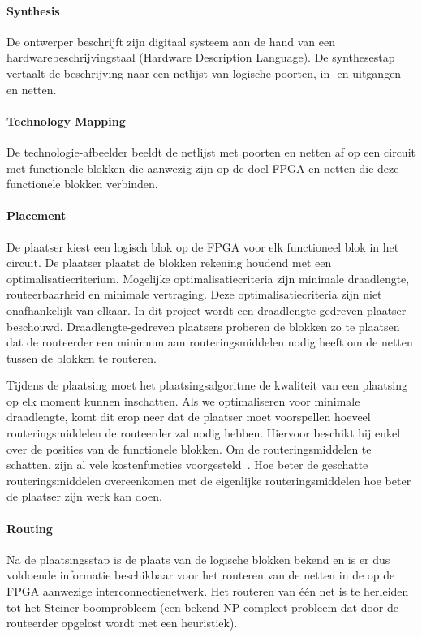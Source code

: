 \documentclass[a4paper,oneside,12pt]{article}
\begin{document}
\paragraph{Synthesis}
De ontwerper beschrijft zijn digitaal systeem aan de hand van een hardwarebeschrijvingstaal (Hardware Description Language). De synthesestap vertaalt de beschrijving naar een netlijst van logische poorten, in- en uitgangen en netten.

\paragraph{Technology Mapping} 
De technologie-afbeelder beeldt de netlijst met poorten en netten af op een circuit met functionele blokken die aanwezig zijn op de doel-FPGA en netten die deze functionele blokken verbinden.

\paragraph{Placement}
De plaatser kiest een logisch blok op de FPGA voor elk functioneel blok in het circuit. De plaatser plaatst de blokken rekening houdend met een optimalisatiecriterium. Mogelijke optimalisatiecriteria zijn minimale draadlengte, routeerbaarheid en minimale vertraging. Deze optimalisatiecriteria zijn niet onafhankelijk van elkaar. In dit project wordt een draadlengte-gedreven plaatser beschouwd. Draadlengte-gedreven plaatsers proberen de blokken zo te plaatsen dat de routeerder een minimum aan routeringsmiddelen nodig heeft om de netten tussen de blokken te routeren.

Tijdens de plaatsing moet het plaatsingsalgoritme de kwaliteit van een plaatsing op elk moment kunnen inschatten. Als we optimaliseren voor minimale draadlengte, komt dit erop neer dat de plaatser moet voorspellen hoeveel routeringsmiddelen de routeerder zal nodig hebben. Hiervoor beschikt hij enkel over de posities van de functionele blokken. Om de routeringsmiddelen te schatten, zijn al vele kostenfuncties voorgesteld~\cite{vprBVRJ, vprboek}. Hoe beter de geschatte routeringsmiddelen overeenkomen met de eigenlijke routeringsmiddelen hoe beter de plaatser zijn werk kan doen.

\paragraph{Routing} Na de plaatsingsstap is de plaats van de logische blokken bekend en is er dus voldoende informatie beschikbaar voor het routeren van de netten in de op de FPGA aanwezige interconnectienetwerk. Het routeren van \'e\'en net is te herleiden tot het Steiner-boomprobleem (een bekend NP-compleet probleem dat door de routeerder opgelost wordt met een heuristiek).
\end{document}

